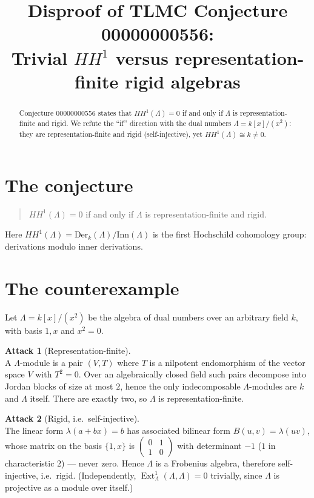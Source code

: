 \documentclass[11pt]{article}
\title{Disproof of TLMC Conjecture 00000000556:\\
Trivial $HH^1$ versus representation-finite rigid algebras}
\author{}
\date{}
\theoremstyle{definition}
\newtheorem{attack}{Attack}
\begin{document}
\maketitle

\begin{abstract}
Conjecture 00000000556 states that $HH^1(\Lambda)=0$ if and only if $\Lambda$
is representation-finite and rigid. We refute the ``if'' direction with the
dual numbers $\Lambda=k[x]/(x^2)$: they are representation-finite and rigid
(self-injective), yet $HH^1(\Lambda)\cong k\neq 0$.
\end{abstract}

\section{The conjecture}

\begin{quote}
$HH^1(\Lambda)=0$ if and only if $\Lambda$ is representation-finite and rigid.
\end{quote}

\noindent Here $HH^1(\Lambda)=\mathrm{Der}_k(\Lambda)/\mathrm{Inn}(\Lambda)$ is
the first Hochschild cohomology group: derivations modulo inner derivations.

\section{The counterexample}

Let $\Lambda=k[x]/(x^2)$ be the algebra of dual numbers over an arbitrary
field $k$, with basis $1,x$ and $x^2=0$.

\begin{attack}[Representation-finite]\leavevmode\\
A $\Lambda$-module is a pair $(V,T)$ where $T$ is a nilpotent endomorphism of
the vector space $V$ with $T^2=0$. Over an algebraically closed field such
pairs decompose into Jordan blocks of size at most $2$, hence the only
indecomposable $\Lambda$-modules are $k$ and $\Lambda$ itself. There are
exactly two, so $\Lambda$ is representation-finite.
\end{attack}

\begin{attack}[Rigid, i.e.\ self-injective]\leavevmode\\
The linear form $\lambda(a+bx)=b$ has associated bilinear form
$B(u,v)=\lambda(uv)$, whose matrix on the basis $\{1,x\}$ is
$\left(\begin{smallmatrix}0&1\\1&0\end{smallmatrix}\right)$ with determinant $-1$
($1$ in characteristic $2$) --- never zero. Hence $\Lambda$ is a Frobenius
algebra, therefore self-injective, i.e.\ rigid. (Independently,
$\operatorname{Ext}^1_\Lambda(\Lambda,\Lambda)=0$ trivially, since $\Lambda$
is projective as a module over itself.)
\end{attack}
\end{document}
